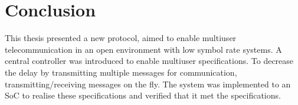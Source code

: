 ﻿\documentclass[twocolumn,9pt]{ltjsarticle}
\begin{document}
\section{Conclusion}
This thesis presented a new protocol, aimed to enable multiuser telecommunication in an open environment with low symbol rate systems.
A central controller was introduced to enable multiuser specifications.
To decrease the delay by transmitting multiple messages for communication, transmitting/receiving messages on the fly.
The system was implemented to an SoC to realise these specifications and verified that it met the specifications.
\end{document}

